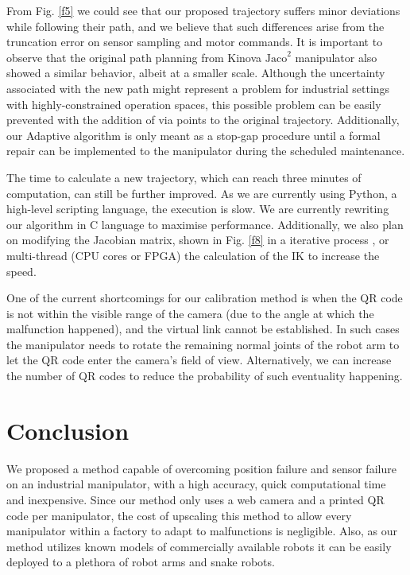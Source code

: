 \documentclass{ieeeaccess}
\newcommand{\degree}{^\circ}
\begin{document}
From Fig. \ref{f5} we could see that our proposed trajectory suffers minor deviations while following their path, and we believe that such differences arise from the truncation error on sensor sampling and motor commands. It is important to observe that the original path planning from Kinova $\text{Jaco}^2$ manipulator also showed a similar behavior, albeit at a smaller scale. Although the uncertainty associated with the new path might represent a problem for industrial settings with highly-constrained operation spaces, this possible problem can be easily prevented with the addition of via points to the original trajectory. Additionally, our Adaptive algorithm is only meant as a stop-gap procedure until a formal repair can be implemented to the manipulator during the scheduled maintenance.

The time to calculate a new trajectory, which can reach three minutes of computation, can still be further improved. As we are currently using Python, a high-level scripting language, the execution is slow. We are currently rewriting our algorithm in C language to maximise performance. Additionally, we also plan on modifying the Jacobian matrix, shown in Fig. \ref{f8} in a iterative process \cite{chen2003optimal}, or multi-thread (CPU cores or FPGA) the calculation of the IK to increase the speed.

One of the current shortcomings for our calibration method is when the QR code is not within the visible range of the camera (due to the angle at which the malfunction happened), and the virtual link cannot be established. In such cases the manipulator needs to rotate the remaining normal joints of the robot arm to let the QR code enter the camera's field of view. Alternatively, we can increase the number of QR codes to reduce the probability of such eventuality happening.


\section{Conclusion}
\label{section:conclusion}


We proposed a method capable of overcoming position failure and sensor failure on an industrial manipulator, with a high accuracy, quick computational time and inexpensive. Since our method only uses a web camera and a printed QR code per manipulator, the cost of upscaling this method to allow every manipulator within a factory to adapt to malfunctions is negligible. Also, as our method utilizes known models of commercially available robots it can be easily deployed to a plethora of robot arms and snake robots.
\end{document}
